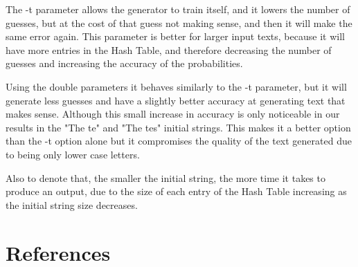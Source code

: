 \documentclass{article}
\begin{document}
The -t parameter allows the generator to train itself, and it lowers the number of guesses, but at the cost of that guess not making sense,
and then it will make the same error again. This parameter is better for larger input texts, because it will have more entries in the Hash Table,
and therefore decreasing the number of guesses and increasing the accuracy of the probabilities.

Using the double parameters it behaves similarly to the -t parameter, but it will generate less guesses and have a slightly better accuracy at generating text that makes sense.
Although this small increase in accuracy is only noticeable in our results in the "The te" and "The tes" initial strings.
This makes it a better option than the -t option alone but it compromises the quality of the text generated due to being only lower case letters.

Also to denote that, the smaller the initial string, the more time it takes to produce an output, due to the size of each entry of 
the Hash Table increasing as the initial string size decreases. 


\section{References}


\end{document}

